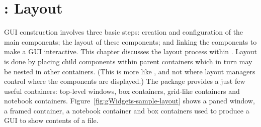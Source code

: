 


\chapter{: Layout}
\label{sec:gWidgets-Containers}




GUI construction involves three basic steps: creation and
configuration of the main components; the layout of these components;
and linking the components to make a GUI interactive. This chapter
discusses the layout process within . Layout is done by
placing child components within parent containers which in turn may be
nested in other containers. (This is more like \GTK, and not \Qt where
layout managers control where the components are displayed.) The
 package provides a just few useful containers:
top-level windows, box containers, grid-like containers and notebook
containers. Figure~\ref{fig:gWidgets-sample-layout} shows a paned
window, a framed container, a notebook container and box containers
used to produce a GUI to show contents of a file.


